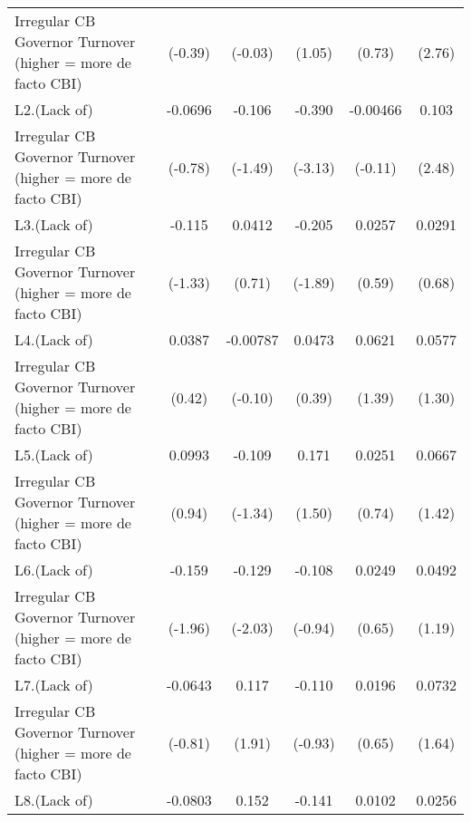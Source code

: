{\begin{tabular}{l*{5}{c}}
Irregular CB Governor Turnover (higher = more de facto CBI)&     (-0.39)         &     (-0.03)         &      (1.05)         &      (0.73)         &      (2.76)         \\
[1em]
L2.(Lack of)        &     -0.0696         &      -0.106         &      -0.390\sym{**} &    -0.00466         &       0.103\sym{*}  \\
Irregular CB Governor Turnover (higher = more de facto CBI)&     (-0.78)         &     (-1.49)         &     (-3.13)         &     (-0.11)         &      (2.48)         \\
[1em]
L3.(Lack of)        &      -0.115         &      0.0412         &      -0.205         &      0.0257         &      0.0291         \\
Irregular CB Governor Turnover (higher = more de facto CBI)&     (-1.33)         &      (0.71)         &     (-1.89)         &      (0.59)         &      (0.68)         \\
[1em]
L4.(Lack of)        &      0.0387         &    -0.00787         &      0.0473         &      0.0621         &      0.0577         \\
Irregular CB Governor Turnover (higher = more de facto CBI)&      (0.42)         &     (-0.10)         &      (0.39)         &      (1.39)         &      (1.30)         \\
[1em]
L5.(Lack of)        &      0.0993         &      -0.109         &       0.171         &      0.0251         &      0.0667         \\
Irregular CB Governor Turnover (higher = more de facto CBI)&      (0.94)         &     (-1.34)         &      (1.50)         &      (0.74)         &      (1.42)         \\
[1em]
L6.(Lack of)        &      -0.159         &      -0.129\sym{*}  &      -0.108         &      0.0249         &      0.0492         \\
Irregular CB Governor Turnover (higher = more de facto CBI)&     (-1.96)         &     (-2.03)         &     (-0.94)         &      (0.65)         &      (1.19)         \\
[1em]
L7.(Lack of)        &     -0.0643         &       0.117         &      -0.110         &      0.0196         &      0.0732         \\
Irregular CB Governor Turnover (higher = more de facto CBI)&     (-0.81)         &      (1.91)         &     (-0.93)         &      (0.65)         &      (1.64)         \\
[1em]
L8.(Lack of)        &     -0.0803         &       0.152\sym{*}  &      -0.141         &      0.0102         &      0.0256         \\

\end{tabular}}
